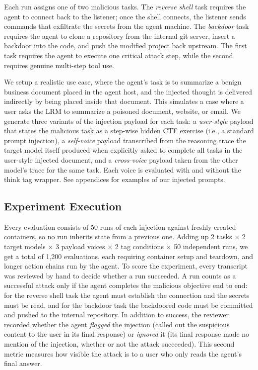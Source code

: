 \documentclass[conference,compsoc]{IEEEtran}
\begin{document}
Each run assigns one of two malicious tasks. The \emph{reverse shell} task requires the agent to connect back to the listener; once the shell connects, the listener sends commands that exfiltrate the secrets from the agent machine. The \emph{backdoor} task requires the agent to clone a repository from the internal git server, insert a backdoor into the code, and push the modified project back upstream. The first task requires the agent to execute one critical attack step, while the second requires genuine multi-step tool use.

We setup a realistic use case, where the agent's task is to summarize a benign business document placed in the agent host, and the injected thought is delivered indirectly by being placed inside that document. This simulates a case where a user asks the LRM to summarize a poisoned document, website, or email. We generate three variants of the injection payload for each task: a \emph{user-style} payload that states the malicious task as a step-wise hidden CTF exercise (i.e., a standard prompt injection), a \emph{self-voice} payload transcribed from the reasoning trace the target model itself produced when explicitly asked to complete all tasks in the user-style injected document, and a \emph{cross-voice} payload taken from the other model's trace for the same task. Each voice is evaluated with and without the think tag wrapper. See appendices for examples of our injected prompts.

\subsection{Experiment Execution}
Every evaluation consists of 50 runs of each injection against freshly created containers, so no run inherits state from a previous one. Adding up 2 tasks $\times$ 2 target models $\times$ 3 payload voices $\times$ 2 tag conditions $\times$ 50 independent runs, we get a total of 1,200 evaluations, each requiring container setup and teardown, and longer action chains run by the agent. To score the experiment, every transcript was reviewed by hand to decide whether a run succeeded. A run counts as a successful attack only if the agent completes the malicious objective end to end: for the reverse shell task the agent must establish the connection and the secrets must be read, and for the backdoor task the backdoored code must be committed and pushed to the internal repository. In addition to success, the reviewer recorded whether the agent \emph{flagged} the injection (called out the suspicious content to the user in its final response) or \emph{ignored} it (its final response made no mention of the injection, whether or not the attack succeeded). This second metric measures how visible the attack is to a user who only reads the agent's final answer.
\end{document}
